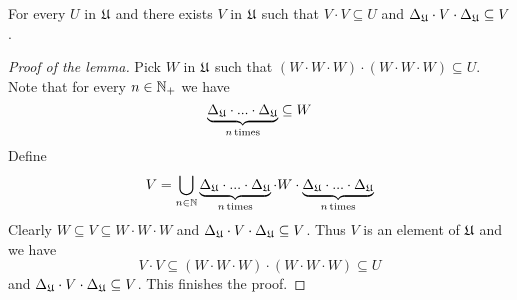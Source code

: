 \begin{lemma}\label{lemma:entourage_closed_under_pseudodiagonal}
For every $U$ in ${\mathfrak U}$ and there exists $V$ in ${\mathfrak U}$ such that $V\cdot V\subseteq U$ and $\Delta_{{\mathfrak U}}\cdot V\cdot \Delta_{{\mathfrak U}}\subseteq V$.
\end{lemma}
\begin{proof}[Proof of the lemma]
Pick $W$ in ${\mathfrak U}$ such that $\left(W\cdot W\cdot W\right) \cdot \left(W \cdot W \cdot W\right) \subseteq U$. Note that for every $n\in {\mathbb N}_+$ we have 
$$\underbrace{\Delta_{{\mathfrak U}}\cdot ...\cdot \Delta_{{\mathfrak U}}}_{n\,\mathrm{times}}\subseteq W$$
Define
$$V = \bigcup_{n\in {\mathbb N}}\underbrace{\Delta_{{\mathfrak U}}\cdot ...\cdot \Delta_{{\mathfrak U}}}_{n\,\mathrm{times}}\cdot W\cdot \underbrace{\Delta_{{\mathfrak U}}\cdot ...\cdot \Delta_{{\mathfrak U}}}_{n\,\mathrm{times}}$$
Clearly $W\subseteq V \subseteq W\cdot W\cdot W$ and $\Delta_{{\mathfrak U}}\cdot V\cdot \Delta_{{\mathfrak U}}\subseteq V$. Thus $V$ is an element of ${\mathfrak U}$ and we have
$$V\cdot V\subseteq \left(W\cdot W\cdot W\right) \cdot \left(W \cdot W \cdot W\right) \subseteq U$$
and $\Delta_{{\mathfrak U}}\cdot V\cdot \Delta_{{\mathfrak U}}\subseteq V$. This finishes the proof.
\end{proof}

